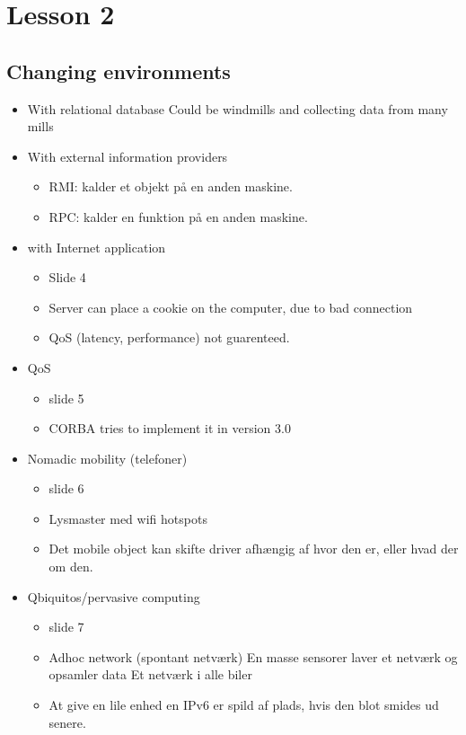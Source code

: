 \documentclass[10pt, a4]{Memoir}
\begin{document}
\section{Lesson 2}

\subsection{Changing environments}
\begin{itemize}
\item With relational database
\subitem Could be windmills and collecting data from many mills

\item With external information providers
	\begin{itemize}
	\item RMI: kalder et objekt på en anden maskine.
	\item RPC: kalder en funktion på en anden maskine.
	\end{itemize}

\item with Internet application
	\begin{itemize}
	\item[] Slide 4
	\item Server can place a cookie on the computer, due to bad connection
	\item QoS (latency, performance) not guarenteed. 
	\end{itemize}

\item QoS
	\begin{itemize}
	\item slide 5
	\item CORBA tries to implement it in version 3.0
	\end{itemize}

\item Nomadic mobility (telefoner)
	\begin{itemize}
	\item slide 6
	\item Lysmaster med wifi hotspots
	\item Det mobile object kan skifte driver afhængig af hvor den er, eller hvad der om den.
	\end{itemize}

\item Qbiquitos/pervasive computing
	\begin{itemize}
	\item slide 7
	\item Adhoc network (spontant netværk)
	\subitem En masse sensorer laver et netværk og opsamler data 	
	\subitem Et netværk i alle biler
	\item At give en lile enhed en IPv6 er spild af plads, hvis den blot smides ud senere.
	\end{itemize}
\end{itemize}
\end{document}
